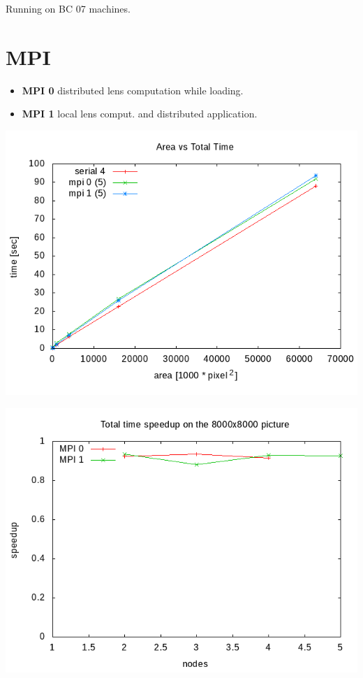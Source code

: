 \documentclass[12pt]{article}
\begin{document}
\small Running on BC 07 machines.

\section{MPI}

\begin{itemize}
    \item \textbf{MPI 0} distributed lens computation while loading.
    \item \textbf{MPI 1} local lens comput. and distributed application.
\end{itemize}

\begin{center}
    \begin{minipage}[b]{0.45\linewidth}
        \includegraphics[width=\textwidth]{../../plots/areatime_total_linear_mpi.png}
    \end{minipage}
    \begin{minipage}[b]{0.45\linewidth}
        \includegraphics[width=\textwidth]{../../plots/mpi_speedup_total_8000_no_ideal.png}
    \end{minipage}
\end{center}
\end{document}

